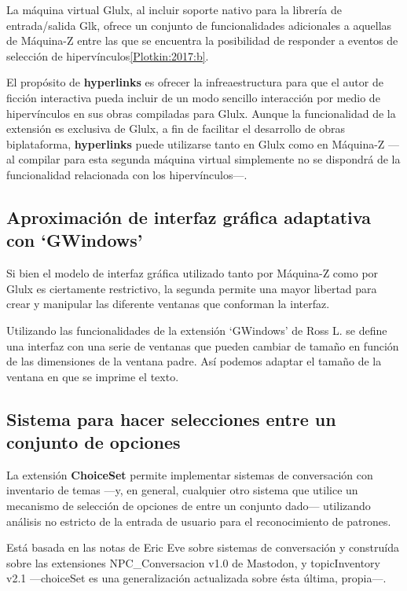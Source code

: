 La máquina virtual Glulx, al incluir soporte nativo para la librería de entrada/salida Glk, ofrece un conjunto de funcionalidades adicionales a aquellas de Máquina-Z entre las que se encuentra la posibilidad de responder a eventos de selección de hipervínculos\ref{Plotkin:2017:b}.

El propósito de \textbf{hyperlinks} es ofrecer la infreaestructura para que el autor de ficción interactiva pueda incluir de un modo sencillo interacción por medio de hipervínculos en sus obras compiladas para Glulx. Aunque la funcionalidad de la extensión es exclusiva de Glulx, a fin de facilitar el desarrollo de obras biplataforma, \textbf{hyperlinks} puede utilizarse tanto en Glulx como en Máquina-Z ---al compilar para esta segunda máquina virtual simplemente no se dispondrá de la funcionalidad relacionada con los hipervínculos---.

\subsection{Aproximación de interfaz gráfica adaptativa con `GWindows'}

Si bien el modelo de interfaz gráfica utilizado tanto por Máquina-Z como por Glulx es ciertamente restrictivo, la segunda permite una mayor libertad para crear y manipular las diferente ventanas que conforman la interfaz.

Utilizando las funcionalidades de la extensión `GWindows' de Ross L. se define una interfaz con una serie de ventanas que pueden cambiar de tamaño en función de las dimensiones de la ventana padre. Así podemos adaptar el tamaño de la ventana en que se imprime el texto.


\subsection{Sistema para hacer selecciones entre un conjunto de opciones}

La extensión \textbf{ChoiceSet} permite implementar sistemas de conversación con inventario de temas ---y, en general, cualquier otro sistema que utilice un mecanismo de selección de opciones de entre un conjunto dado--- utilizando análisis no estricto de la entrada de usuario para el reconocimiento de patrones.

Está basada en las notas de Eric Eve sobre sistemas de conversación\cite{Eve:2008} y construída sobre las extensiones NPC\_Conversacion v1.0 de Mastodon, y topicInventory v2.1 ---choiceSet es una generalización actualizada sobre ésta última, propia---.

